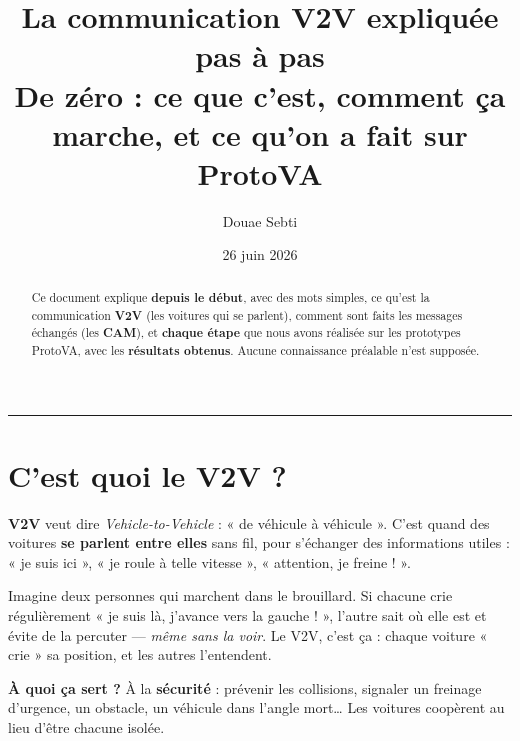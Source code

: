 \documentclass[a4paper,11pt]{article}
\title{\textbf{La communication V2V expliquée pas à pas}\\[2mm]
\large De zéro : ce que c'est, comment ça marche, et ce qu'on a fait sur ProtoVA}
\author{Douae Sebti}
\date{26 juin 2026}
\begin{document}
\maketitle

\begin{abstract}
\noindent Ce document explique \textbf{depuis le début}, avec des mots simples, ce
qu'est la communication \textbf{V2V} (les voitures qui se parlent), comment sont
faits les messages échangés (les \textbf{CAM}), et \textbf{chaque étape} que nous
avons réalisée sur les prototypes ProtoVA, avec les \textbf{résultats obtenus}.
Aucune connaissance préalable n'est supposée.
\end{abstract}

\tableofcontents
\bigskip\hrule

\section{C'est quoi le V2V ?}
\textbf{V2V} veut dire \emph{Vehicle-to-Vehicle} : « de véhicule à véhicule ».
C'est quand des voitures \textbf{se parlent entre elles} sans fil, pour
s'échanger des informations utiles : « je suis ici », « je roule à telle vitesse »,
« attention, je freine ! ».

\begin{analogie}
Imagine deux personnes qui marchent dans le brouillard. Si chacune crie
régulièrement « je suis là, j'avance vers la gauche ! », l'autre sait où elle est
et évite de la percuter — \emph{même sans la voir}. Le V2V, c'est ça : chaque
voiture « crie » sa position, et les autres l'entendent.
\end{analogie}

\textbf{À quoi ça sert ?} À la \textbf{sécurité} : prévenir les collisions, signaler
un freinage d'urgence, un obstacle, un véhicule dans l'angle mort\ldots{} Les
voitures coopèrent au lieu d'être chacune isolée.

\end{document}
